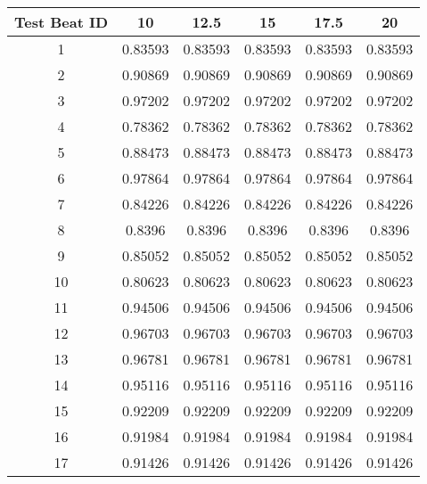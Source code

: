 \begin{tabular}{|c|c|c|c|c|c|}
\hline 
Test Beat ID & 10 & 12.5 & 15 & 17.5 & 20 \\ 
\hline 
1 & 0.83593 & 0.83593 & 0.83593 & 0.83593 & 0.83593 \\ 
2 & 0.90869 & 0.90869 & 0.90869 & 0.90869 & 0.90869 \\ 
3 & 0.97202 & 0.97202 & 0.97202 & 0.97202 & 0.97202 \\ 
4 & 0.78362 & 0.78362 & 0.78362 & 0.78362 & 0.78362 \\ 
5 & 0.88473 & 0.88473 & 0.88473 & 0.88473 & 0.88473 \\ 
6 & 0.97864 & 0.97864 & 0.97864 & 0.97864 & 0.97864 \\ 
7 & 0.84226 & 0.84226 & 0.84226 & 0.84226 & 0.84226 \\ 
8 & 0.8396 & 0.8396 & 0.8396 & 0.8396 & 0.8396 \\ 
9 & 0.85052 & 0.85052 & 0.85052 & 0.85052 & 0.85052 \\ 
10 & 0.80623 & 0.80623 & 0.80623 & 0.80623 & 0.80623 \\ 
11 & 0.94506 & 0.94506 & 0.94506 & 0.94506 & 0.94506 \\ 
12 & 0.96703 & 0.96703 & 0.96703 & 0.96703 & 0.96703 \\ 
13 & 0.96781 & 0.96781 & 0.96781 & 0.96781 & 0.96781 \\ 
14 & 0.95116 & 0.95116 & 0.95116 & 0.95116 & 0.95116 \\ 
15 & 0.92209 & 0.92209 & 0.92209 & 0.92209 & 0.92209 \\ 
16 & 0.91984 & 0.91984 & 0.91984 & 0.91984 & 0.91984 \\ 
17 & 0.91426 & 0.91426 & 0.91426 & 0.91426 & 0.91426 \\ 
\hline 
\end{tabular}
